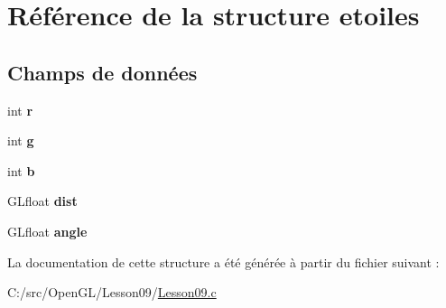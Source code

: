 \hypertarget{structetoiles}{}\section{Référence de la structure etoiles}
\label{structetoiles}
\subsection*{Champs de données}
\begin{DoxyCompactItemize}
\item 
\hypertarget{structetoiles_acab531abaa74a7e664e3986f2522b33a}{}int {\bfseries r}\label{structetoiles_acab531abaa74a7e664e3986f2522b33a}

\item 
\hypertarget{structetoiles_a71867e609034d4dbd6d0ad8d84540e59}{}int {\bfseries g}\label{structetoiles_a71867e609034d4dbd6d0ad8d84540e59}

\item 
\hypertarget{structetoiles_a148e3876077787926724625411d6e7a9}{}int {\bfseries b}\label{structetoiles_a148e3876077787926724625411d6e7a9}

\item 
\hypertarget{structetoiles_aca30104159dc097b8371fb74ab4173d2}{}G\+Lfloat {\bfseries dist}\label{structetoiles_aca30104159dc097b8371fb74ab4173d2}

\item 
\hypertarget{structetoiles_ab47b818590551b1663a0cd5c060d92b6}{}G\+Lfloat {\bfseries angle}\label{structetoiles_ab47b818590551b1663a0cd5c060d92b6}

\end{DoxyCompactItemize}


La documentation de cette structure a été générée à partir du fichier suivant \+:\begin{DoxyCompactItemize}
\item 
C\+:/src/\+Open\+G\+L/\+Lesson09/\hyperlink{_lesson09_8c}{Lesson09.\+c}\end{DoxyCompactItemize}
